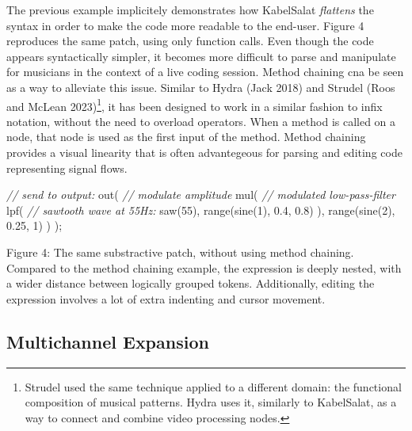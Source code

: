 \documentclass[11pt,]{article}
\newenvironment{Shaded}{}{}
\newcommand{\CommentTok}[1]{\textcolor[rgb]{0.38,0.63,0.69}{\textit{#1}}}
\newcommand{\DecValTok}[1]{\textcolor[rgb]{0.25,0.63,0.44}{#1}}
\newcommand{\FloatTok}[1]{\textcolor[rgb]{0.25,0.63,0.44}{#1}}
\newcommand{\FunctionTok}[1]{\textcolor[rgb]{0.02,0.16,0.49}{#1}}
\newcommand{\NormalTok}[1]{#1}
\newcommand{\OperatorTok}[1]{\textcolor[rgb]{0.40,0.40,0.40}{#1}}
\begin{document}
The previous example implicitely demonstrates how KabelSalat
\emph{flattens} the syntax in order to make the code more readable to
the end-user. Figure 4 reproduces the same patch, using only function
calls. Even though the code appears syntactically simpler, it becomes
more difficult to parse and manipulate for musicians in the context of a
live coding session. Method chaining cna be seen as a way to alleviate
this issue. Similar to Hydra (Jack 2018) and Strudel (Roos and McLean
2023)\footnote{Strudel used the same technique applied to a different
  domain: the functional composition of musical patterns. Hydra uses it,
  similarly to KabelSalat, as a way to connect and combine video
  processing nodes.}, it has been designed to work in a similar fashion
to infix notation, without the need to overload operators. When a method
is called on a node, that node is used as the first input of the method.
Method chaining provides a visual linearity that is often advantegeous
for parsing and editing code representing signal flows.

\begin{Shaded}
\begin{Highlighting}[]
\CommentTok{// send to output:}
\FunctionTok{out}\NormalTok{(}
  \CommentTok{// modulate amplitude}
  \FunctionTok{mul}\NormalTok{(}
    \CommentTok{// modulated low{-}pass{-}filter}
    \FunctionTok{lpf}\NormalTok{(}
      \CommentTok{// sawtooth wave at 55Hz:}
      \FunctionTok{saw}\NormalTok{(}\DecValTok{55}\NormalTok{)}\OperatorTok{,}
      \FunctionTok{range}\NormalTok{(}\FunctionTok{sine}\NormalTok{(}\DecValTok{1}\NormalTok{)}\OperatorTok{,} \FloatTok{0.4}\OperatorTok{,} \FloatTok{0.8}\NormalTok{)}
\NormalTok{    )}\OperatorTok{,}
    \FunctionTok{range}\NormalTok{(}\FunctionTok{sine}\NormalTok{(}\DecValTok{2}\NormalTok{)}\OperatorTok{,} \FloatTok{0.25}\OperatorTok{,} \DecValTok{1}\NormalTok{)}
\NormalTok{  )}
\NormalTok{)}\OperatorTok{;}
\end{Highlighting}
\end{Shaded}

Figure 4: The same substractive patch, without using method chaining.
Compared to the method chaining example, the expression is deeply
nested, with a wider distance between logically grouped tokens.
Additionally, editing the expression involves a lot of extra indenting
and cursor movement.

\newpage

\subsection{Multichannel Expansion}\label{multichannel-expansion}
\end{document}
